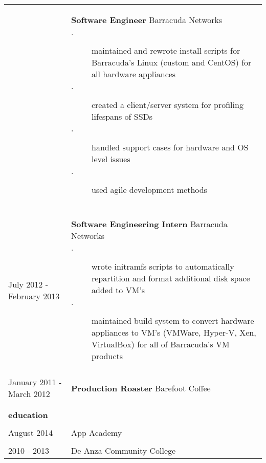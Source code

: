 \documentclass{article}
\begin{document}
\begin{tabular}{L{2.5cm} R{14cm}}
    &

    \textbf{Software Engineer}
    Barracuda Networks

    \begin{description}
        \item[$\cdot$] maintained and rewrote install scripts for Barracuda's Linux 
            (custom and CentOS) for all hardware appliances
        \item[$\cdot$] created a client/server system for profiling lifespans of
            SSDs
        \item[$\cdot$] handled support cases for hardware and OS level issues
        \item[$\cdot$] used agile development methods
    \end{description}

    \\\\
    
    July 2012 - February 2013
    &
    \textbf{Software Engineering Intern}
    Barracuda Networks

    \begin{description}
        \item[$\cdot$] wrote initramfs scripts to automatically repartition and 
            format additional disk space added to VM's
        \item[$\cdot$] maintained build system to convert hardware appliances to VM's
            (VMWare, Hyper-V, Xen, VirtualBox) for all of Barracuda's VM products
    \end{description}

    \\\\
    
    January 2011 - March 2012
    &
    \textbf{Production Roaster}
    Barefoot Coffee
    
    \\\\ \hline \\

    \large{\textbf{education}} \\\\
    \normalsize

    August 2014 & App Academy \\

    \\

    2010 - 2013 & De Anza Community College \\
\end{tabular}
\end{document}
